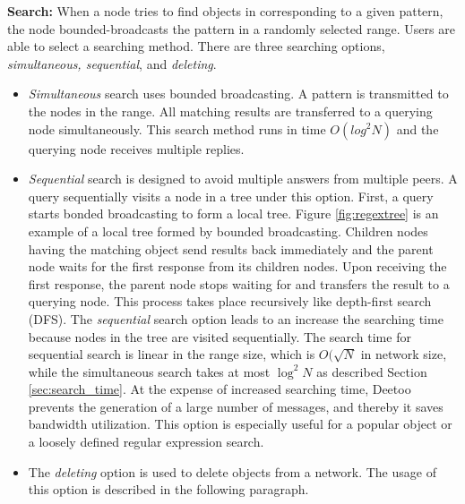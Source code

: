 \textbf{Search:}
When a node tries to find objects in corresponding to a given pattern, the node bounded-broadcasts 
the pattern in a randomly selected range. 
Users are able to select a searching method. There are three searching options, 
\textit{simultaneous, sequential}, and \textit{deleting}.
\begin{itemize}
\item \textit{Simultaneous} search uses bounded broadcasting. A pattern is transmitted 
to the nodes in the range. All matching results are transferred to a querying 
node simultaneously. This search method runs in time $O(log^2 N)$ and the querying node 
receives multiple replies.
\item \textit{Sequential} search is designed to avoid multiple answers from multiple peers.
A query sequentially visits a node in a tree under this option. 
First, a query starts bonded broadcasting to form a local tree. 
Figure \ref{fig:regextree} is an example of a local tree formed by bounded broadcasting. 
Children nodes having the matching object send results back immediately and the 
parent node waits for the first response from its children nodes. Upon receiving 
the first response, the parent node stops waiting for and transfers the result to a querying 
node. This process takes place recursively like depth-first search (DFS). 
The \textit{sequential} search option leads to an increase the searching time because nodes in the
tree are visited sequentially. The search time for sequential search is linear
in the range size, which is $O(\sqrt{N}$ in network size, while 
the simultaneous search takes at most $\log^2 N$ as described Section \ref{sec:search_time}.
At the expense of increased searching time, Deetoo prevents the generation of a large number of 
messages, and thereby it saves bandwidth utilization.
This option is especially useful for a popular object or a loosely defined regular expression search.
\item The \textit{deleting} option is used to delete objects from a network. 
The usage of this option is described in the following paragraph.
\end{itemize}

